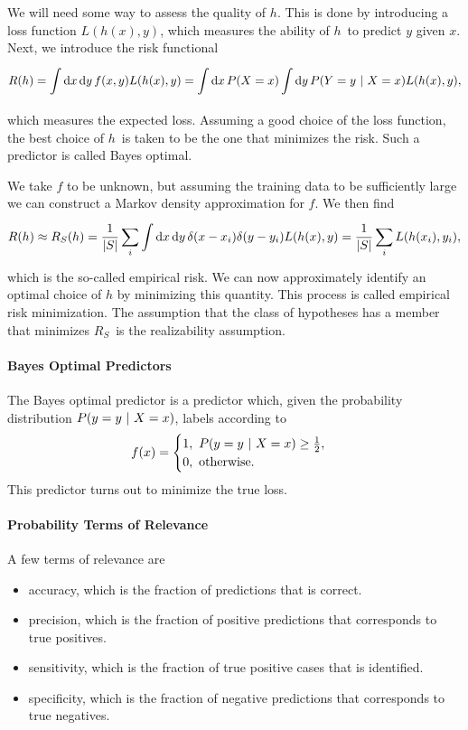 We will need some way to assess the quality of $h$. This is done by introducing a loss function $L(h(x), y)$, which measures the ability of $h$ to predict $y$ given $x$. Next, we introduce the risk functional
\begin{align*}
	R(h) = \int\limits_{}^{}\dd{x}\dd{y}f(x, y)L(h(x), y) = \int\limits_{}^{}\dd{x}P(X = x)\int\limits_{}^{}\dd{y}P(Y = y\ \vert\  X = x)L(h(x), y),
\end{align*}
which measures the expected loss. Assuming a good choice of the loss function, the best choice of $h$ is taken to be the one that minimizes the risk. Such a predictor is called Bayes optimal.

We take $f$ to be unknown, but assuming the training data to be sufficiently large we can construct a Markov density approximation for $f$. We then find
\begin{align*}
	R(h)\approx R_{S}(h) = \frac{1}{\abs{S}}\sum\limits_{i}\int\limits_{}^{}\dd{x}\dd{y}\delta(x - x_{i})\delta(y - y_{i})L(h(x), y) = \frac{1}{\abs{S}}\sum\limits_{i}L(h(x_{i}), y_{i}),
\end{align*}
which is the so-called empirical risk. We can now approximately identify an optimal choice of $h$ by minimizing this quantity. This process is called empirical risk minimization. The assumption that the class of hypotheses has a member that minimizes $R_{S}$ is the realizability assumption.

\paragraph{Bayes Optimal Predictors}
The Bayes optimal predictor is a predictor which, given the probability distribution $P(y = y\ \vert\  X = x)$, labels according to
\begin{align*}
	f(x) = 
	\begin{cases}
		1,\ P(y = y\ \vert\  X = x) \geq \frac{1}{2}, \\
		0,\ \text{otherwise}.
	\end{cases}
\end{align*}
This predictor turns out to minimize the true loss.

\paragraph{Probability Terms of Relevance}
A few terms of relevance are
\begin{itemize}
	\item accuracy, which is the fraction of predictions that is correct.
	\item precision, which is the fraction of positive predictions that corresponds to true positives.
	\item sensitivity, which is the fraction of true positive cases that is identified.
	\item specificity, which is the fraction of negative predictions that corresponds to true negatives.
\end{itemize}

